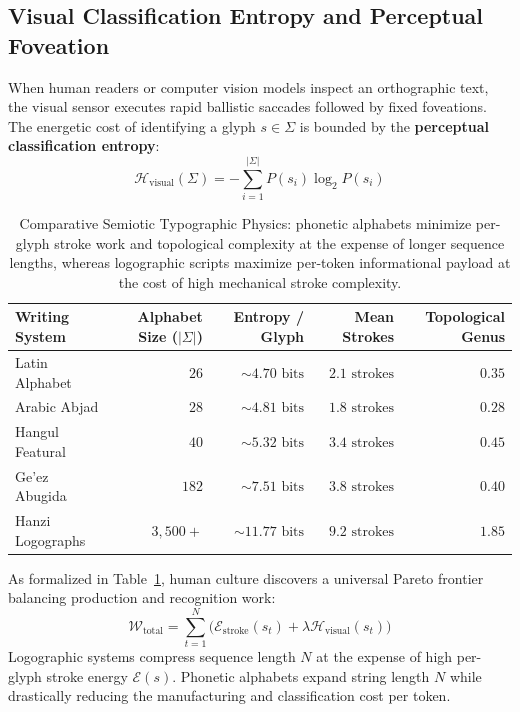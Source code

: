 \documentclass[11pt,letterpaper]{article}
\begin{document}
\subsection{Visual Classification Entropy and Perceptual Foveation}
When human readers or computer vision models inspect an orthographic text, the visual sensor executes rapid ballistic saccades followed by fixed foveations. The energetic cost of identifying a glyph $s \in \Sigma$ is bounded by the \textbf{perceptual classification entropy}:
\begin{equation}
\mathcal{H}_{\text{visual}}(\Sigma) = -\sum_{i=1}^{|\Sigma|} P(s_i) \log_2 P(s_i)
\end{equation}

\begin{table}[htbp]
\centering
\small
\begin{tabular}{lrrrr}
\toprule
\textbf{Writing System} & \textbf{Alphabet Size ($|\Sigma|$)} & \textbf{Entropy / Glyph} & \textbf{Mean Strokes} & \textbf{Topological Genus} \\
\midrule
Latin Alphabet & $26$ & $\sim 4.70\text{ bits}$ & $2.1\text{ strokes}$ & $0.35$ \\
Arabic Abjad & $28$ & $\sim 4.81\text{ bits}$ & $1.8\text{ strokes}$ & $0.28$ \\
Hangul Featural & $40$ & $\sim 5.32\text{ bits}$ & $3.4\text{ strokes}$ & $0.45$ \\
Ge'ez Abugida & $182$ & $\sim 7.51\text{ bits}$ & $3.8\text{ strokes}$ & $0.40$ \\
Hanzi Logographs & $3{,}500+$ & $\sim 11.77\text{ bits}$ & $9.2\text{ strokes}$ & $1.85$ \\
\bottomrule
\end{tabular}
\caption{Comparative Semiotic Typographic Physics: phonetic alphabets minimize per-glyph stroke work and topological complexity at the expense of longer sequence lengths, whereas logographic scripts maximize per-token informational payload at the cost of high mechanical stroke complexity.}
\label{tab:typographic_physics}
\end{table}

As formalized in Table~\ref{tab:typographic_physics}, human culture discovers a universal Pareto frontier balancing production and recognition work:
\begin{equation}
\mathcal{W}_{\text{total}} = \sum_{t=1}^N \Big( \mathcal{E}_{\text{stroke}}(s_t) + \lambda \mathcal{H}_{\text{visual}}(s_t) \Big)
\end{equation}
Logographic systems compress sequence length $N$ at the expense of high per-glyph stroke energy $\mathcal{E}(s)$. Phonetic alphabets expand string length $N$ while drastically reducing the manufacturing and classification cost per token.
\end{document}
